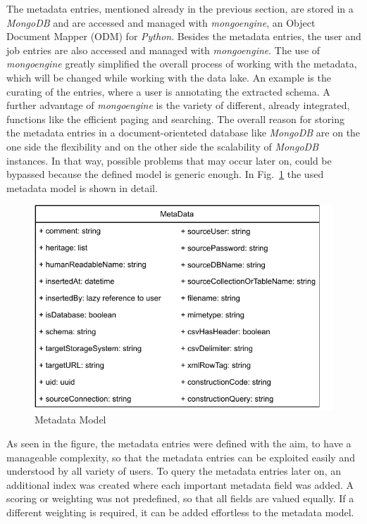 \documentclass[conference]{IEEEtran}
\begin{document}
The metadata entries, mentioned already in the previous section, are stored in a \textit{MongoDB} and are 
accessed and managed with \textit{mongoengine}, an Object Document Mapper (ODM) for \textit{Python}. 
Besides the metadata entries, the user and job entries are also accessed and managed with 
\textit{mongoengine}. 
The use of \textit{mongoengine} greatly simplified the overall process of working with the metadata, which 
will be changed while working with the data lake. 
An example is the curating of the entries, where a user is annotating the extracted schema. 
A further advantage of \textit{mongoengine} is the variety of different, already integrated, functions like 
the efficient paging and searching. 
The overall reason for storing the metadata entries in a document-orienteted database like \textit{MongoDB}
are on the one side the flexibility and on the other side the scalability of \textit{MongoDB} instances. 
In that way, possible problems that may occur later on, could be bypassed because the defined model
is generic enough. 
In Fig.~\ref{MM} the used metadata model is shown in detail.

\begin{figure}[h]
\centerline{\includegraphics[scale=0.75]{graphics/metadata_model.pdf}}
\caption{Metadata Model}
\label{MM}
\end{figure}

As seen in the figure, the metadata entries were defined with the aim, to have a manageable 
complexity, so that the metadata entries can be exploited easily and understood by all variety of
users. 
To query the metadata entries later on, an additional index was created where each important 
metadata field was added. 
A scoring or weighting was not predefined, so that all fields are valued equally. 
If a different weighting is required, it can be added effortless to the metadata model.
\end{document}
